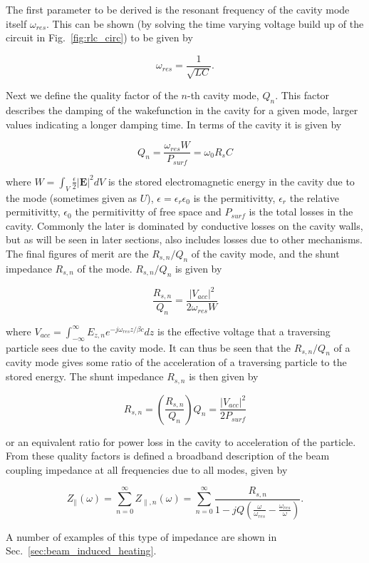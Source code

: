 The first parameter to be derived is the resonant frequency of the cavity mode itself $\omega_{res}$. This can be shown (by solving the time varying voltage build up of the circuit in Fig.~\ref{fig:rlc_circ}) to be given by

\begin{equation}
\omega_{res} = \frac{1}{\sqrt{LC}}.
\end{equation}

Next we define the quality factor of the $n$-th cavity mode, $Q_{n}$. This factor describes the damping of the wakefunction in the cavity for a given mode, larger values indicating a longer damping time. In terms of the cavity it is given by

\begin{equation}
Q_{n} = \frac{\omega_{res} W}{P_{surf}} = \omega_{0}R_{s}C
\end{equation}

where $W = \int_{V} \frac{\epsilon}{2} \left| \mathbf{E} \right|^{2} dV$ is the stored electromagnetic energy in the cavity due to the mode (sometimes given as $U$), $\epsilon = \epsilon_{r}\epsilon_{0}$ is the permitivitty, $\epsilon_{r}$ the relative permitivitty, $\epsilon_{0}$ the permitivitty of free space and $P_{surf}$ is the total losses in the cavity. Commonly the later is dominated by conductive losses on the cavity walls, but as will be seen in later sections, also includes losses due to other mechanisms. The final figures of merit are the $R_{s, n}/Q_{n}$ of the cavity mode, and the shunt impedance $R_{s, n}$ of the mode. $R_{s, n}/Q_{n}$ is given by

\begin{equation}
\frac{R_{s, n}}{Q_{n}} = \frac{\left| V_{acc} \right|^{2}}{2 \omega_{res} W}
\end{equation}

where $V_{acc} = \int^{\infty}_{-\infty} E_{z, n} e^{-j \omega_{res} z/ \beta{}c} dz$ is the effective voltage that a traversing particle sees due to the cavity mode. It can thus be seen that the $R_{s, n}/Q_{n}$ of a cavity mode gives some ratio of the acceleration of a traversing particle to the stored energy. The shunt impedance $R_{s, n}$ is then given by

\begin{equation}
R_{s, n} = \left(  \frac{R_{s, n}}{Q_{n}} \right) Q_{n} = \frac{\left| V_{acc} \right|^{2}}{2 P_{surf}}
\end{equation}

or an equivalent ratio for power loss in the cavity to acceleration of the particle. From these quality factors is defined a broadband description of the beam coupling impedance at all frequencies due to all modes, given by

\begin{equation}
Z_{\parallel} \left( \omega \right) = \displaystyle\sum\limits_{n = 0}^{\infty} Z_{\parallel, n} \left( \omega \right) = \displaystyle\sum\limits_{n = 0}^{\infty} \frac{R_{s, n}}{1 - jQ \left( \frac{\omega}{\omega_{res}} - \frac{\omega_{res}}{\omega} \right)}.
\end{equation}

A number of examples of this type of impedance are shown in Sec.~\ref{sec:beam_induced_heating}.